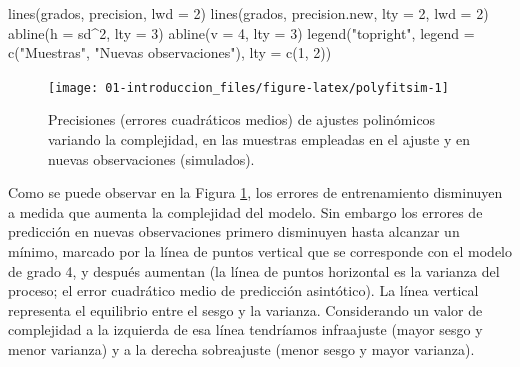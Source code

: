 \documentclass[
]{book}
\newenvironment{Shaded}{\begin{snugshade}}{\end{snugshade}}
\newcommand{\AttributeTok}[1]{\textcolor[rgb]{0.77,0.63,0.00}{#1}}
\newcommand{\DecValTok}[1]{\textcolor[rgb]{0.00,0.00,0.81}{#1}}
\newcommand{\FunctionTok}[1]{\textcolor[rgb]{0.00,0.00,0.00}{#1}}
\newcommand{\NormalTok}[1]{#1}
\newcommand{\SpecialCharTok}[1]{\textcolor[rgb]{0.00,0.00,0.00}{#1}}
\newcommand{\StringTok}[1]{\textcolor[rgb]{0.31,0.60,0.02}{#1}}
\theoremstyle{break}
\theoremstyle{nonumberplain}
\begin{document}
\begin{Shaded}
\begin{Highlighting}[]
\FunctionTok{lines}\NormalTok{(grados, precision, }\AttributeTok{lwd =} \DecValTok{2}\NormalTok{)}
\FunctionTok{lines}\NormalTok{(grados, precision.new, }\AttributeTok{lty =} \DecValTok{2}\NormalTok{, }\AttributeTok{lwd =} \DecValTok{2}\NormalTok{)}
\FunctionTok{abline}\NormalTok{(}\AttributeTok{h =}\NormalTok{ sd}\SpecialCharTok{\^{}}\DecValTok{2}\NormalTok{, }\AttributeTok{lty =} \DecValTok{3}\NormalTok{)}
\FunctionTok{abline}\NormalTok{(}\AttributeTok{v =} \DecValTok{4}\NormalTok{, }\AttributeTok{lty =} \DecValTok{3}\NormalTok{)}
\FunctionTok{legend}\NormalTok{(}\StringTok{"topright"}\NormalTok{, }\AttributeTok{legend =} \FunctionTok{c}\NormalTok{(}\StringTok{"Muestras"}\NormalTok{, }\StringTok{"Nuevas observaciones"}\NormalTok{), }\AttributeTok{lty =} \FunctionTok{c}\NormalTok{(}\DecValTok{1}\NormalTok{, }\DecValTok{2}\NormalTok{))}
\end{Highlighting}
\end{Shaded}

\begin{figure}[!htb]

{\centering \texttt{[image: 01-introduccion\_files/figure-latex/polyfitsim-1]} 

}

\caption{Precisiones (errores cuadráticos medios) de ajustes polinómicos variando la complejidad, en las muestras empleadas en el ajuste y en nuevas observaciones (simulados).}\label{fig:polyfitsim}
\end{figure}

Como se puede observar en la Figura \ref{fig:polyfitsim}, los errores de entrenamiento disminuyen a medida que aumenta la complejidad del modelo.
Sin embargo los errores de predicción en nuevas observaciones primero disminuyen hasta alcanzar un mínimo, marcado por la línea de puntos vertical que se corresponde con el modelo de grado 4, y después aumentan (la línea de puntos horizontal es la varianza del proceso; el error cuadrático medio de predicción asintótico).
La línea vertical representa el equilibrio entre el sesgo y la varianza.
Considerando un valor de complejidad a la izquierda de esa línea tendríamos infraajuste (mayor sesgo y menor varianza) y a la derecha sobreajuste (menor sesgo y mayor varianza).
\end{document}

